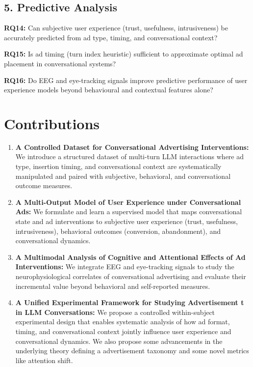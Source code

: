 \documentclass{article}
\begin{document}
\subsection{5. Predictive Analysis}

\textbf{RQ14:} Can subjective user experience (trust, usefulness, intrusiveness) be accurately predicted from ad type, timing, and conversational context?

\textbf{RQ15:} Is ad timing (turn index heuristic) sufficient to approximate optimal ad placement in conversational systems?

\textbf{RQ16:} Do EEG and eye-tracking signals improve predictive performance of user experience models beyond behavioural and contextual features alone?

\newpage

\section{Contributions}
\label{Contributions}

\begin{enumerate}

\item \textbf{A Controlled Dataset for Conversational Advertising Interventions:}  
We introduce a structured dataset of multi-turn LLM interactions where ad type, insertion timing, and conversational context are systematically manipulated and paired with subjective, behavioral, and conversational outcome measures.

\vspace{0.2cm}

\item \textbf{A Multi-Output Model of User Experience under Conversational Ads:}  
We formulate and learn a supervised model that maps conversational state and ad interventions to subjective user experience (trust, usefulness, intrusiveness), behavioral outcomes (conversion, abandonment), and conversational dynamics.

\vspace{0.2cm}

\item \textbf{A Multimodal Analysis of Cognitive and Attentional Effects of Ad Interventions:}  
We integrate EEG and eye-tracking signals to study the neurophysiological correlates of conversational advertising and evaluate their incremental value beyond behavioral and self-reported measures.

\vspace{0.2cm}

\item \textbf{A Unified Experimental Framework for Studying Advertisement t in LLM Conversations:}  
We propose a controlled within-subject experimental design that enables systematic analysis of how ad format, timing, and conversational context jointly influence user experience and conversational dynamics. We also propose some advancements in the underlying theory defining a advertisement taxonomy and some novel metrics like attention shift.

\end{enumerate}
\end{document}

